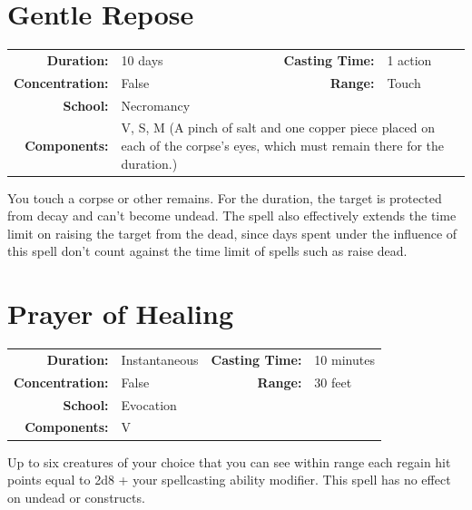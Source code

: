 \documentclass[12pt,showtrims]{memoir}
\begin{document}
\newpage
\section*{Gentle Repose}

{
\small\centering\vspace{-6pt}
\begin{tabular}{rlrl}
\toprule

\textbf{Duration:} & 10 days &
\textbf{Casting Time:} & 1 action \\
\textbf{Concentration:} & False &
\textbf{Range:} & Touch \\
\textbf{School:} & Necromancy \\
\textbf{Components:} & \multicolumn{3}{p{0.7\textwidth}}{V, S, M (A pinch of salt and one copper piece placed on each of the corpse's eyes, which must remain there for the duration.)}\\

\bottomrule
\end{tabular}
}

\vspace{1\baselineskip}\noindent You touch a corpse or other remains. For the duration, the target is protected from decay and can't become undead. The spell also effectively extends the time limit on raising the target from the dead, since days spent under the influence of this spell don't count against the time limit of spells such as raise dead.

\newpage
\section*{Prayer of Healing}

{
\small\centering\vspace{-6pt}
\begin{tabular}{rlrl}
\toprule

\textbf{Duration:} & Instantaneous &
\textbf{Casting Time:} & 10 minutes \\
\textbf{Concentration:} & False &
\textbf{Range:} & 30 feet \\
\textbf{School:} & Evocation \\
\textbf{Components:} & \multicolumn{3}{p{0.7\textwidth}}{V}\\

\bottomrule
\end{tabular}
}

\vspace{1\baselineskip}\noindent Up to six creatures of your choice that you can see within range each regain hit points equal to 2d8 + your spellcasting ability modifier. This spell has no effect on undead or constructs.
\end{document}
